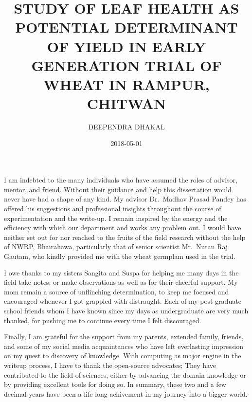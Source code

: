 \documentclass[12pt,oneside]{dukestatscithesis} %
\title{STUDY OF LEAF HEALTH AS POTENTIAL DETERMINANT OF YIELD IN EARLY
GENERATION TRIAL OF WHEAT IN RAMPUR, CHITWAN}
\author{DEEPENDRA DHAKAL}
\date{2018-05-01}
\theoremstyle{definition}
\theoremstyle{definition}
\theoremstyle{definition}
\theoremstyle{remark}
\begin{document}
% 
\setlength{\baselineskip}{1.5\baselineskip}


\frontmatter %
\pagestyle{empty} %
  \begin{acknowledgements}
    \setlength{\baselineskip}{1.5\baselineskip} I am indebted to the many
    individuals who have assumed the roles of advisor, mentor, and friend.
    Without their guidance and help this dissertation would never have had a
    shape of any kind. My advisor Dr.~Madhav Prasad Pandey has offered his
    suggestions and professional insights throughout the course of
    experimentation and the write-up. I remain inspired by the energy and
    the efficiency with which our department and works any problem out. I
    would have neither set out for nor reached to the fruits of the field
    research without the help of NWRP, Bhairahawa, particularly that of
    senior scientist Mr.~Nutan Raj Gautam, who kindly provided me with the
    wheat germplam used in the trial. \par
    
    I owe thanks to my sisters Sangita and Suspa for helping me many days in
    the field take notes, or make observations as well as for their cheerful
    support. My mom remain a source of unflinching determination, to keep me
    focused and encouraged whenever I got grappled with distraught. Each of
    my post graduate school friends whom I have known since my days as
    undergraduate are very much thanked, for pushing me to continue every
    time I felt discouraged. \par
    
    Finally, I am grateful for the support from my parents, extended family,
    friends, and some of my social media acquaintances who have left
    everlasting impression on my quest to discovery of knowledge. With
    computing as major engine in the writeup process, I have to thank the
    open-source advocates; They have contributed to the field of sciences,
    either by advancing the domain knowledge or by providing excellent tools
    for doing so. In summary, these two and a few decimal years have been a
    life long achivement in my journey into a bigger world.
  \end{acknowledgements}
\end{document}
